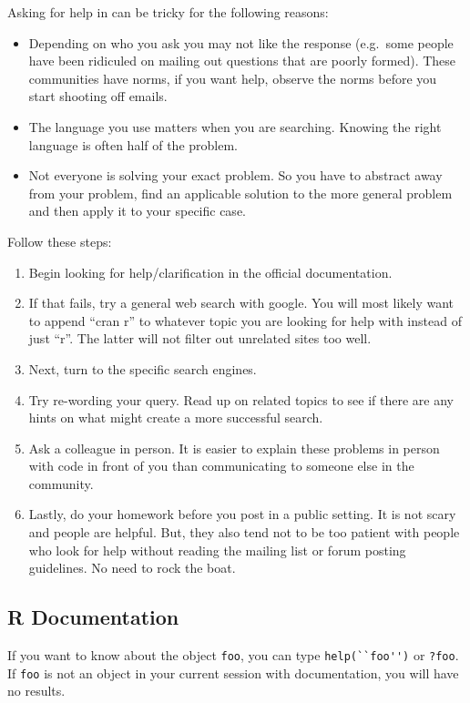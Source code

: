 Asking for help in \R{} can be tricky for the following reasons:
\begin{itemize}
\item Depending on who you ask you may not like the response (e.g.\
  some people have been ridiculed on mailing out questions that are
  poorly formed). These communities have norms, if you want help,
  observe the norms before you start shooting off emails.

\item The language you use matters when you are searching. Knowing the
  right language is often half of the problem.

\item Not everyone is solving your exact problem. So you have to
  abstract away from your problem, find an applicable solution to the
  more general problem and then apply it to your specific case.
\end{itemize}

Follow these steps:
\begin{enumerate}
\item Begin looking for help/clarification in the official
  \R{} documentation.

\item If that fails, try a general web search with google. You will
  most likely want to append ``cran r'' to whatever topic you are
  looking for help with instead of just ``r''. The latter will not
  filter out unrelated sites too well.

\item Next, turn to the \R{} specific search engines.

\item Try re-wording your query. Read up on related topics to see if
  there are any hints on what might create a more successful search.

\item Ask a colleague in person. It is easier to explain these
  problems in person with code in front of you than communicating to
  someone else in the \R{} community.

\item Lastly, do your homework before you post in a public setting. It
  is not scary and people are helpful. But, they also tend not to be
  too patient with people who look for help without reading the
  mailing list or forum posting guidelines. No need to rock the boat.
\end{enumerate}

\subsection{R Documentation}
If you want to know about the object \texttt{foo}, you can type
\verb=help(``foo'')= or \verb=?foo=. If \texttt{foo} is not an object
in your current session with documentation, you will have no results.

